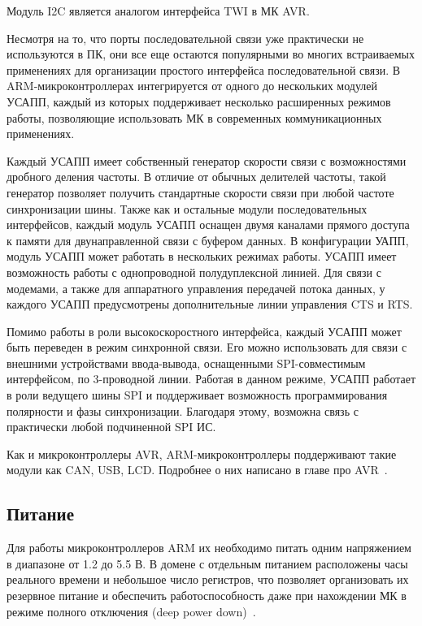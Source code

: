 \documentclass[12pt, oneside]{altsu-report}
\begin{document}
Модуль I2C является аналогом интерфейса TWI в МК AVR.

Несмотря на то, что порты последовательной связи уже практически не используются в ПК, они все еще остаются популярными во многих встраиваемых применениях для организации простого интерфейса последовательной связи. В ARM-микроконтроллерах интегрируется от одного до нескольких модулей УСАПП, каждый из которых поддерживает несколько расширенных режимов работы, позволяющие использовать МК в современных коммуникационных применениях.

Каждый УСАПП имеет собственный генератор скорости связи с возможностями дробного деления частоты. В отличие от обычных делителей частоты, такой генератор позволяет получить стандартные скорости связи при любой частоте синхронизации шины. Также как и остальные модули последовательных интерфейсов, каждый модуль УСАПП оснащен двумя каналами прямого доступа к памяти для двунаправленной связи с буфером данных. В конфигурации УАПП, модуль УСАПП может работать в нескольких режимах работы. УСАПП имеет возможность работы с однопроводной полудуплексной линией. Для связи с модемами, а также для аппаратного управления передачей потока данных, у каждого УСАПП предусмотрены дополнительные линии управления CTS и RTS.

Помимо работы в роли высокоскоростного интерфейса, каждый УСАПП может быть переведен в режим синхронной связи. Его можно использовать для связи с внешними устройствами ввода-вывода, оснащенными SPI-совместимым интерфейсом, по 3-проводной линии. Работая в данном режиме, УСАПП работает в роли ведущего шины SPI и поддерживает возможность программирования полярности и фазы синхронизации. Благодаря этому, возможна связь с практически любой подчиненной SPI ИС.

Как и микроконтроллеры AVR, ARM-микроконтроллеры поддерживают такие модули как CAN, USB, LCD. Подробнее о них написано в главе про AVR~\cite{ARM-M3}.

\subsection{Питание}

Для работы микроконтроллеров ARM их необходимо питать одним напряжением в диапазоне от 1.2 до 5.5 В. В домене с отдельным питанием расположены часы реального времени и небольшое число регистров, что позволяет организовать их резервное питание и обеспечить работоспособность даже при нахождении МК в режиме полного отключения (deep power down)~\cite{ARM-M3}.
\end{document}
